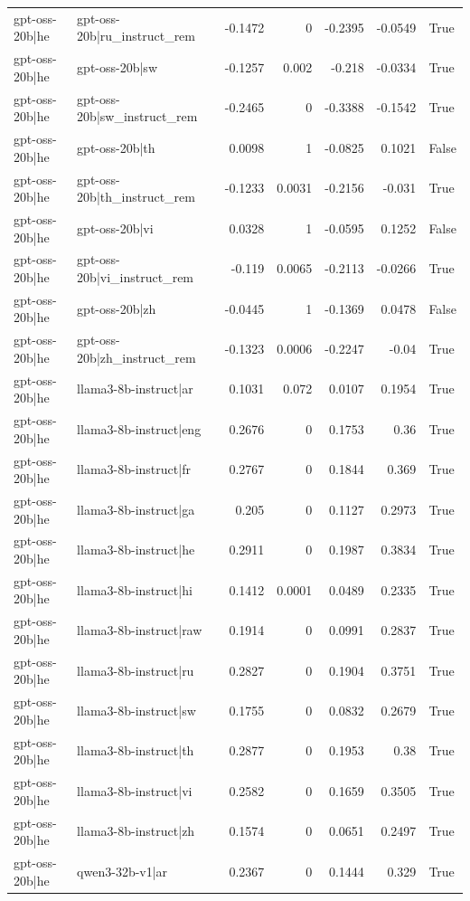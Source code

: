 \begin{table}
\begin{tabular}{l l r r r r l}
gpt-oss-20b|he & gpt-oss-20b|ru_instruct_rem & -0.1472 & 0 & -0.2395 & -0.0549 & True \\
gpt-oss-20b|he & gpt-oss-20b|sw & -0.1257 & 0.002 & -0.218 & -0.0334 & True \\
gpt-oss-20b|he & gpt-oss-20b|sw_instruct_rem & -0.2465 & 0 & -0.3388 & -0.1542 & True \\
gpt-oss-20b|he & gpt-oss-20b|th & 0.0098 & 1 & -0.0825 & 0.1021 & False \\
gpt-oss-20b|he & gpt-oss-20b|th_instruct_rem & -0.1233 & 0.0031 & -0.2156 & -0.031 & True \\
gpt-oss-20b|he & gpt-oss-20b|vi & 0.0328 & 1 & -0.0595 & 0.1252 & False \\
gpt-oss-20b|he & gpt-oss-20b|vi_instruct_rem & -0.119 & 0.0065 & -0.2113 & -0.0266 & True \\
gpt-oss-20b|he & gpt-oss-20b|zh & -0.0445 & 1 & -0.1369 & 0.0478 & False \\
gpt-oss-20b|he & gpt-oss-20b|zh_instruct_rem & -0.1323 & 0.0006 & -0.2247 & -0.04 & True \\
gpt-oss-20b|he & llama3-8b-instruct|ar & 0.1031 & 0.072 & 0.0107 & 0.1954 & True \\
gpt-oss-20b|he & llama3-8b-instruct|eng & 0.2676 & 0 & 0.1753 & 0.36 & True \\
gpt-oss-20b|he & llama3-8b-instruct|fr & 0.2767 & 0 & 0.1844 & 0.369 & True \\
gpt-oss-20b|he & llama3-8b-instruct|ga & 0.205 & 0 & 0.1127 & 0.2973 & True \\
gpt-oss-20b|he & llama3-8b-instruct|he & 0.2911 & 0 & 0.1987 & 0.3834 & True \\
gpt-oss-20b|he & llama3-8b-instruct|hi & 0.1412 & 0.0001 & 0.0489 & 0.2335 & True \\
gpt-oss-20b|he & llama3-8b-instruct|raw & 0.1914 & 0 & 0.0991 & 0.2837 & True \\
gpt-oss-20b|he & llama3-8b-instruct|ru & 0.2827 & 0 & 0.1904 & 0.3751 & True \\
gpt-oss-20b|he & llama3-8b-instruct|sw & 0.1755 & 0 & 0.0832 & 0.2679 & True \\
gpt-oss-20b|he & llama3-8b-instruct|th & 0.2877 & 0 & 0.1953 & 0.38 & True \\
gpt-oss-20b|he & llama3-8b-instruct|vi & 0.2582 & 0 & 0.1659 & 0.3505 & True \\
gpt-oss-20b|he & llama3-8b-instruct|zh & 0.1574 & 0 & 0.0651 & 0.2497 & True \\
gpt-oss-20b|he & qwen3-32b-v1|ar & 0.2367 & 0 & 0.1444 & 0.329 & True \\

\end{tabular}
\end{table}
